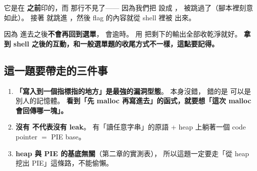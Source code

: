 \begin{keybox}
它是在  \textbf{之前}印的，而  那行不見了——
因為我們把  設成 ， 被跳過了（腳本裡刻意如此）。
接著  就跳進 ，然後 flag 的內容就從 shell 裡被  出來。
\end{keybox}

\begin{keybox}
因為  進去之後\textbf{不會再回到選單}， 會逾時。
用  把剩下的輸出全部收乾淨就好。
\textbf{拿到 shell 之後的互動，和一般選單題的收尾方式不一樣，這點要記得。}
\end{keybox}

\subsection{這一題要帶走的三件事}

\begin{enumerate}[leftmargin=1.5em,itemsep=3pt]
  \item \textbf{「寫入到一個指標指的地方」是最強的漏洞型態}。
         本身沒錯，
        錯的是  可以是別人的記憶體。
        \textbf{看到「先 malloc 再寫進去」的函式，就要想「這次 malloc 會回傳哪一塊」。}
  \item \textbf{沒有  不代表沒有 leak}。
        有「讀任意字串」的原語 + heap 上躺著一個 code pointer $=$ PIE base。
  \item \textbf{heap 與 PIE 的基底無關}（第二章的實測表），
        所以這題一定要走「從 heap 挖出 PIE」這條路，不能偷懶。
\end{enumerate}
